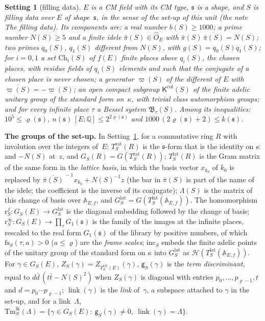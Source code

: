 \documentclass[11pt,a4paper]{article}
\newcommand{\Q}{\mathbb{Q}}
\newcommand{\m}[1]{\mbox{$#1$}}        %
\newcommand{\subhead}[1]{\par\addvspace{9pt plus 2pt}\Needspace{4\baselineskip}\noindent\textbf{#1}\enspace\ignorespaces}
\theoremstyle{plainx}
\theoremstyle{uprightx}
\newtheorem{setting}[theorem]{Setting}          %
\newcommand{\fs}{\mathfrak{s}}                      %
\newcommand{\AEf}{\mathbb{A}_{E,f}}
\newcommand{\hO}{\hat{O}_E}
\newcommand{\rh}[1]{\varrho(#1)}                    %
\newcommand{\kk}[1]{k(#1)}                          %
\newcommand{\nn}[1]{n(#1)}                          %
\newcommand{\ninf}[1]{f(#1)}                        %
\newcommand{\bS}[1]{b(#1)}                          %
\newcommand{\NS}[1]{N(#1)}                          %
\newcommand{\qS}[2]{q_{#2}(#1)}                     %
\newcommand{\gS}[1]{g(#1)}                          %
\newcommand{\piS}[1]{\bar\pi(#1)}                   %
\newcommand{\vpS}[1]{\varpi(#1)}                    %
\newcommand{\ChS}[2]{\mathrm{Ch}_{#2}(#1)}          %
\newcommand{\KcolS}[1]{\mathsf{K}^{\mathrm{col}}(#1)}        %
\newcommand{\BsysS}[2]{\mathfrak{B}_{#2}(#1)}       %
\newcommand{\Trat}[2]{T^{\mathrm{rat}}_{#1}(#2)}    %
\newcommand{\Tlat}[2]{T^{\mathrm{lat}}_{#1}(#2)}    %
\newcommand{\GS}[2]{G_{#1}(#2)}                     %
\newcommand{\GFin}[1]{G^{\mathrm{lat}}_{#1}}        %
\newcommand{\latB}[1]{\Lambda(#1)}                  %
\newcommand{\rinf}[1]{\mathrm{r}^{\infty}_{#1}}     %
\newcommand{\rfin}[1]{\mathrm{r}^{f}_{#1}}          %
\newcommand{\incH}[1]{\mathrm{inc}_{#1}}            %
\newcommand{\Zf}[2]{Z_{#1}(#2)}                     %
\newcommand{\tdisc}[2]{\mathsf{g}_{#1}(#2)}         %
\newcommand{\fscale}[3]{\mathrm{fs}_{#1}(#2,#3)}    %
\newcommand{\link}[1]{\operatorname{link}(#1)}      %
\newcommand{\GT}[1]{G(#1)}                          %
\newcommand{\HT}[1]{\mathcal{H}(#1)}                %
\newcommand{\ZT}[2]{Z_{#1}(#2)}                     %
\newcommand{\tlink}[2]{\mathrm{Tm}^{\mathrm{lk}}_{#1}(#2)} %
\begin{document}
\begin{setting}[filling data]\label{s:S}
$E$ is a CM field with its CM type, $\fs$ is a shape, and $S$ is filling data over $E$ of shape~$\fs$, in the
sense of the set-up of this unit (the note \emph{The filling data}). Its components are: a real number
\m{\bS{S}\ge1000}; a prime number \m{\NS{S}\ge5} and a finite idele \m{\piS{S}\in\hO} with
\m{\piS{S}\,\overline{\piS{S}}=\NS{S}}; two primes \m{\qS{S}{0}}, \m{\qS{S}{1}} different from \m{\NS{S}}, with
\m{\gS{S}=\qS{S}{0}\qS{S}{1}}; for \m{i=0,1} a set \m{\ChS{S}{i}} of \m{\ninf{E}} finite places above
\m{\qS{S}{i}}, the \emph{chosen places}, with residue fields of \m{\qS{S}{i}} elements and such that the
conjugate of a chosen place is never chosen; a generator \m{\vpS{S}} of the different of $E$ with
\m{\overline{\vpS{S}}=-\vpS{S}}; an open compact subgroup \m{\KcolS{S}} of the finite adelic unitary group of the
standard form on~$\kappa$, with trivial class automorphism groups; and for every infinite place $\tau$ a
Bessel system \m{\BsysS{S}{\tau}}. Among its inequalities: \m{10^5\le\rh{\fs}},
\m{\nn{\fs}\,[E:\Q]\le2^{2\rh{\fs}}} and \m{1000\,(2\rh{\fs}+2)\le\kk{\fs}}.
\end{setting}

\subhead{The groups of the set-up.} In Setting~\ref{s:S}, for a commutative ring $R$ with involution over the
integers of~$E$: \m{\Trat{S}{R}} is the $\fs$-form that is the identity on $\kappa$ and \m{-\NS{S}} at~$z$, and
\m{\GS{S}{R}=\GT{\Trat{S}{R}}}; \m{\Tlat{S}{R}} is the Gram matrix of the same form in the \emph{lattice basis}, in
which the basis vector \m{x_{k_0}} of $k_0$ is replaced by \m{\overline{\piS{S}}^{\,-1}x_{k_0}+\NS{S}^{-1}z} (the
bar in \m{\piS{S}} is part of the name of the idele; the coefficient is the inverse of its conjugate);
\m{\latB{S}} is the matrix of this change of basis over \m{\AEf}, and
\m{\GFin{S}=\GT{\Tlat{S}{\AEf}}}. The homomorphism \m{\rfin{S}\colon\GS{S}{E}\to\GFin{S}} is the diagonal embedding
followed by the change of basis; \m{\rinf{S}\colon\GS{S}{E}\to\prod_\tau G_1(\fs)} is the family of the images at
the infinite places, rescaled to the real form \m{G_1(\fs)} of the library by positive numbers, of which
\m{\fscale{S}{\tau}{a}>0} (\m{a\le\varrho}) are the \emph{frame scales}; \m{\incH{S}} embeds the finite adelic points
of the unitary group of the standard form on $\kappa$ into \m{\GFin{S}} as \m{\HT{\Tlat{S}{\AEf}}}. For
\m{\gamma\in\GS{S}{E}}, \m{\Zf{S}{\gamma}=\ZT{\Trat{S}{E}}{\gamma}}, \m{\tdisc{S}{\gamma}} is the \emph{term discriminant},
equal to \m{d\bar d\,(t\bar t-\NS{S}^2)} when \m{\Zf{S}{\gamma}} is diagonal with entries \m{p_0,\dots,p_{\varrho-1},t}
and \m{d=p_0\cdots p_{\varrho-1}}; \m{\link{\gamma}} is the \emph{link} of~$\gamma$, a subspace attached to $\gamma$ in
the set-up, and for a link~$\Lambda$,
\m{\tlink{S}{\Lambda}=\{\gamma\in\GS{S}{E}:\ \tdisc{S}{\gamma}\ne0,\ \link{\gamma}=\Lambda\}}.
\end{document}
